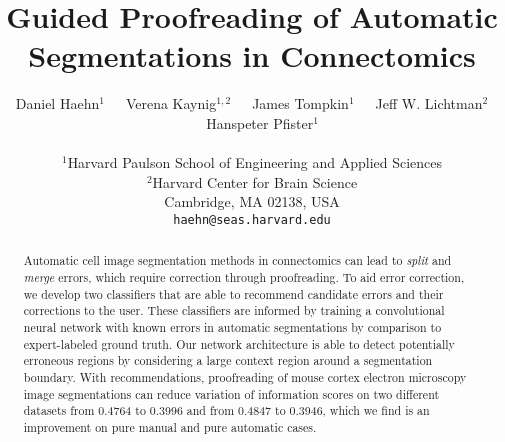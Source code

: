 \documentclass[10pt,twocolumn,letterpaper]{article}
\newcommand\Mark[1]{\textsuperscript#1}
\begin{document}
\title{Guided Proofreading of Automatic Segmentations in Connectomics}
%

\author{Daniel Haehn$^1$~~~Verena Kaynig$^{1,2}$~~~James Tompkin$^1$~~~Jeff W. Lichtman$^2$~~~Hanspeter Pfister$^1$\\~\\
$^1$Harvard Paulson School of Engineering and Applied Sciences\\
$^2$Harvard Center for Brain Science\\
Cambridge, MA 02138, USA\\
{\tt\small haehn@seas.harvard.edu}
}

\maketitle

\begin{abstract}
Automatic cell image segmentation methods in connectomics can lead to \emph{split} and \emph{merge} errors, which require correction through proofreading. To aid error correction, we develop two classifiers that are able to recommend candidate errors and their corrections to the user. These classifiers are informed by training a convolutional neural network with known errors in automatic segmentations by comparison to expert-labeled ground truth. Our network architecture is able to detect potentially erroneous regions by considering a large context region around a segmentation boundary. With recommendations, proofreading of mouse cortex electron microscopy image segmentations can reduce variation of information scores on two different datasets from 0.4764 to 0.3996 and from 0.4847 to 0.3946, which we find is an improvement on pure manual and pure automatic cases.
\end{abstract}







{\small


}
\end{document}
